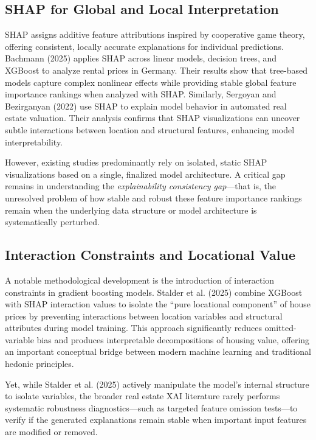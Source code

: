 \documentclass[12pt,a4paper,oneside,openany]{book}
\begin{document}
\subsection{SHAP for Global and Local Interpretation}

SHAP assigns additive feature attributions inspired by cooperative game theory, offering consistent, locally accurate explanations for individual predictions. Bachmann (2025) applies SHAP across linear models, decision trees, and XGBoost to analyze rental prices in Germany. Their results show that tree-based models capture complex nonlinear effects while providing stable global feature importance rankings when analyzed with SHAP. Similarly, Sergoyan and Bezirganyan (2022) use SHAP to explain model behavior in automated real estate valuation. Their analysis confirms that SHAP visualizations can uncover subtle interactions between location and structural features, enhancing model interpretability.

However, existing studies predominantly rely on isolated, static SHAP visualizations based on a single, finalized model architecture. A critical gap remains in understanding the \textit{explainability consistency gap}---that is, the unresolved problem of how stable and robust these feature importance rankings remain when the underlying data structure or model architecture is systematically perturbed.

\subsection{Interaction Constraints and Locational Value}

A notable methodological development is the introduction of interaction constraints in gradient boosting models. Stalder et al. (2025) combine XGBoost with SHAP interaction values to isolate the ``pure locational component'' of house prices by preventing interactions between location variables and structural attributes during model training. This approach significantly reduces omitted-variable bias and produces interpretable decompositions of housing value, offering an important conceptual bridge between modern machine learning and traditional hedonic principles. 

Yet, while Stalder et al. (2025) actively manipulate the model's internal structure to isolate variables, the broader real estate XAI literature rarely performs systematic robustness diagnostics---such as targeted feature omission tests---to verify if the generated explanations remain stable when important input features are modified or removed.
\end{document}
